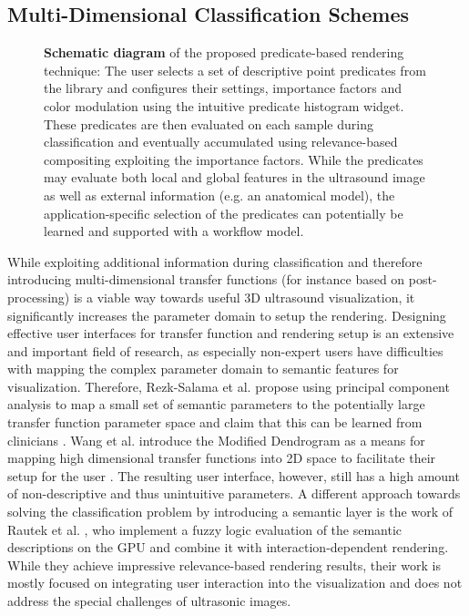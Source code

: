\subsection{Multi-Dimensional Classification Schemes}

\begin{figure}[ht]
	\centering
	
	\caption{
		\textbf{Schematic diagram} of the proposed predicate-based rendering technique: The user selects a set of descriptive point predicates from the library and configures their settings, importance factors and color modulation using the intuitive predicate histogram widget. 
		These predicates are then evaluated on each sample during classification and eventually accumulated using relevance-based compositing exploiting the importance factors. 
		While the predicates may evaluate both local and global features in the ultrasound image as well as external information (e.g. an anatomical model), the application-specific selection of the predicates can potentially be learned and supported with a workflow model.
	}
	\label{fig:predicates:schematic-diagram}
\end{figure}

While exploiting additional information during classification and therefore introducing multi-dimensional transfer functions \cite{Kniss02,Sereda06,Prassni10} (for instance based on post-processing) is a viable way towards useful 3D ultrasound visualization, it significantly increases the parameter domain to setup the rendering. 
Designing effective user interfaces for transfer function and rendering setup is an extensive and important field of research, as especially non-expert users have difficulties with mapping the complex parameter domain to semantic features for visualization. 
Therefore, Rezk-Salama et al. propose using principal component analysis to map a small set of semantic parameters to the potentially large transfer function parameter space and claim that this can be learned from clinicians \cite{Salama06}. 
Wang et al. introduce the Modified Dendrogram as a means for mapping high dimensional transfer functions into 2D space to facilitate their setup for the user \cite{Wang12}. 
The resulting user interface, however, still has a high amount of non-descriptive and thus unintuitive parameters.
A different approach towards solving the classification problem by introducing a semantic layer is the work of Rautek et al. \cite{Rautek08}, who implement a fuzzy logic evaluation of the semantic descriptions on the GPU and combine it with interaction-dependent rendering. 
While they achieve impressive relevance-based rendering results, their work is mostly focused on integrating user interaction into the visualization and does not address the special challenges of ultrasonic images. 


